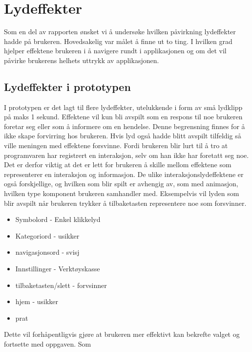  
\section{Lydeffekter} 
 
 
Som en del av rapporten ønsket vi å undersøke hvilken påvirkning lydeffekter hadde på brukeren. Hovedsakelig var målet å finne ut to ting. I hvilken grad hjelper effektene brukeren i å navigere rundt i applikasjonen og om det vil påvirke brukerens helhets uttrykk av applikasjonen.  
 
 
\subsection{Lydeffekter i prototypen} 
 
 
I prototypen er det lagt til flere lydeffekter, utelukkende i form av små lydklipp på maks 1 sekund. Effektene vil kun bli avspilt som en respons til noe brukeren foretar seg eller som å informere om en hendelse. Denne begrensning finnes for å ikke skape forvirring hos brukeren. Hvis lyd også hadde blitt avspilt tilfeldig så ville meningen med effektene forsvinne. Fordi brukeren blir lurt til å tro at programvaren har registrert en interaksjon, selv om han ikke har foretatt seg noe. Det er derfor viktig at det er lett for brukeren å skille mellom effektene som representerer en interaksjon og informasjon. De ulike interaksjonslydeffektene er også forskjellige, og hvilken som blir spilt er avhengig av,  som med animasjon,  hvilken type komponent brukeren samhandler med. Eksempelvis vil lyden som blir avspilt når brukeren trykker å tilbaketasten representere noe som forsvinner.  
 
 
 
 
\begin{itemize} 
\item Symbolord - Enkel klikkelyd 
\item Kategoriord - usikker 
\item navigasjonsord - svisj 
\item Innstillinger - Verktøyskasse 
\item tilbaketasten/slett - forvsinner 
\item hjem - usikker 
\item prat 
\end{itemize} 
 
 
 
Dette vil forhåpentligvis gjøre at brukeren mer effektivt kan bekrefte valget og fortsette med oppgaven. Som  
 
